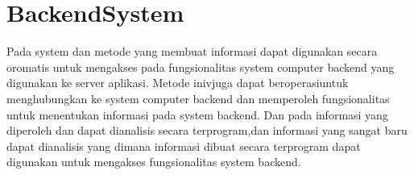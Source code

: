 \section{BackendSystem}
Pada system dan metode  yang membuat informasi dapat digunakan secara oromatis untuk mengakses pada fungsionalitas system computer backend yang digunakan ke server aplikasi. Metode inivjuga dapat beroperasiuntuk menghubungkan ke system computer backend dan memperoleh fungsionalitas untuk menentukan informasi  pada system backend. Dan pada informasi yang diperoleh dan dapat dianalisis secara terprogram,dan informasi yang sangat baru dapat dianalisis yang dimana informasi dibuat secara terprogram dapat digunakan untuk mengakses fungsionalitas system backend.




		

